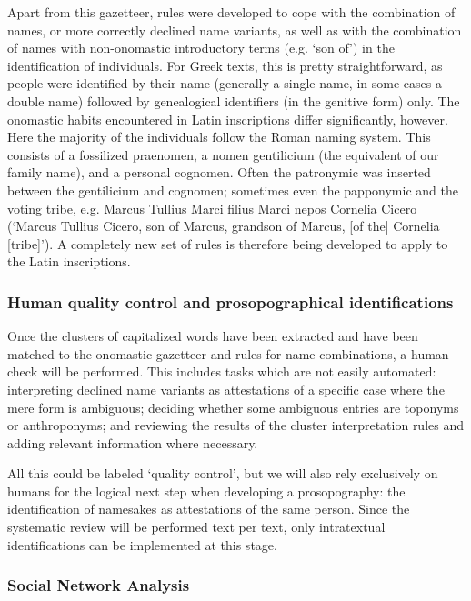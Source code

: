 \documentclass[amsthm,ebook]{saparticle}
\begin{document}
Apart from this gazetteer, rules were developed to cope with the combination of names, or more correctly declined name
variants, as well as with the combination of names with non-onomastic introductory terms (e.g. `son of') in the
identification of individuals. For Greek texts, this is pretty straightforward, as people were identified by their name
(generally a single name, in some cases a double name) followed by genealogical identifiers (in the genitive form)
only. The onomastic habits encountered in Latin inscriptions differ significantly, however. Here the majority of the
individuals follow the Roman naming system. This consists of a fossilized praenomen, a nomen gentilicium (the
equivalent of our family name), and a personal cognomen. Often the patronymic was inserted between the gentilicium and
cognomen; sometimes even the papponymic and the voting tribe, e.g. Marcus Tullius Marci filius Marci nepos Cornelia
Cicero (`Marcus Tullius Cicero, son of Marcus, grandson of Marcus, [of the] Cornelia [tribe]'). A completely new set of
rules is therefore being developed to apply to the Latin inscriptions.




\subsubsection{Human quality control and prosopographical identifications}


\noindent Once the clusters of capitalized words have been extracted and have been matched to the onomastic gazetteer and rules
for name combinations, a human check will be performed. This includes tasks which are not easily automated:
interpreting declined name variants as attestations of a specific case where the mere form is ambiguous; deciding
whether some ambiguous entries are toponyms or anthroponyms; and reviewing the results of the cluster interpretation
rules and adding relevant information where necessary. 

All this could be labeled `quality control', but we will also rely exclusively on humans for the logical next step when
developing a prosopography: the identification of namesakes as attestations of the same person. Since the systematic
review will be performed text per text, only intratextual identifications can be implemented at this stage.




\subsubsection{Social Network Analysis}
\end{document}
